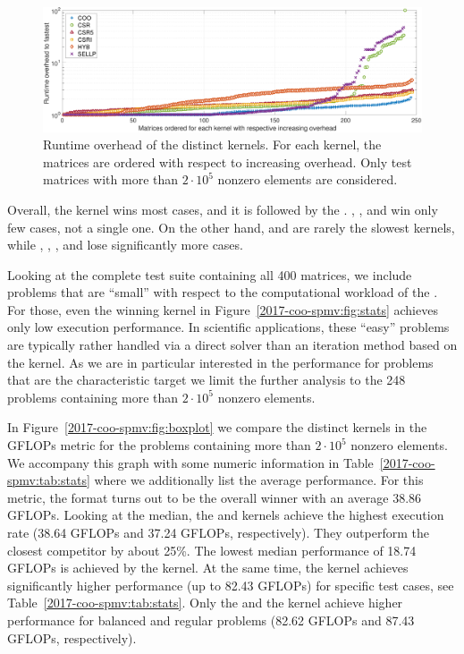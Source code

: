 \begin{figure}
\begin{center}
\includegraphics[width=\columnwidth]{plots/overhead_log_2e5}
\end{center}
\caption{Runtime overhead of the distinct \spmv kernels. For each kernel, the matrices are ordered with respect to increasing overhead. Only test matrices with more than $2\cdot 10^5$ nonzero elements are considered.}
\label{2017-coo-spmv:fig:overhead}
\end{figure}

Overall, the \coo kernel wins most cases, and it is followed by the \sellp
\spmv. \csr, \csri, and \hyb win only few cases, \csrfive not a single one. On
the other hand, \csrfive and \csr are rarely the slowest kernels, while
\coo, \csri, \sellp, and \hyb lose significantly more cases.

Looking at the complete test suite containing all 400 matrices, 
we include problems that are ``small'' with respect to the computational workload of the \spmv.
For those, even the winning kernel in Figure~\ref{2017-coo-spmv:fig:stats} achieves 
only low execution performance. 
In scientific applications, these ``easy'' problems are typically rather handled via a direct solver
than an iteration method based on the \spmv kernel.
As we are in particular interested in the performance for problems 
that are the characteristic target we limit the further analysis to the 248 
problems containing more than $2\cdot 10^5$ nonzero elements.

In Figure~\ref{2017-coo-spmv:fig:boxplot} we compare the distinct \spmv kernels in the GFLOPs 
metric for the problems containing more than $2\cdot 10^5$ nonzero elements.
We accompany this graph with some numeric information in 
Table~\ref{2017-coo-spmv:tab:stats} where we additionally 
list the average performance. 
For this metric, the \coo format turns out to be the
overall winner with an average 38.86 GFLOPs.
Looking at the median, the \sellp and \coo kernels 
achieve the highest execution rate (38.64 GFLOPs and 37.24 GFLOPs, respectively).
They outperform the closest competitor \csr by about 25\%.
The lowest median performance of 18.74 GFLOPs is achieved by the \hyb kernel.
At the same time, the \hyb kernel achieves significantly higher performance 
(up to 82.43 GFLOPs) for specific test cases, see Table~\ref{2017-coo-spmv:tab:stats}.
Only the \sellp and the \csr kernel achieve higher performance for balanced and regular 
problems (82.62 GFLOPs and 87.43 GFLOPs, respectively).

